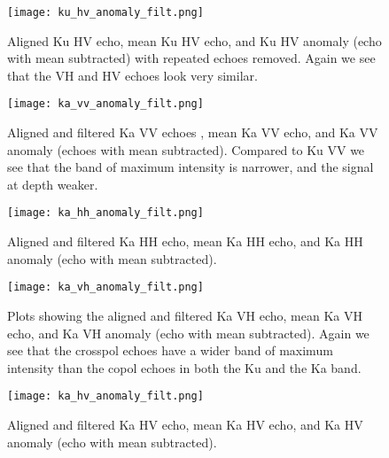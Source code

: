 \documentclass[11pt, a4paper]{article}
\begin{document}
\begin{figure}[H]
   		 \texttt{[image: ku\_hv\_anomaly\_filt.png]}
    		\caption{Aligned Ku HV echo, mean Ku HV echo,  and Ku HV anomaly (echo with mean subtracted) with repeated echoes removed. Again we see that the VH and HV echoes look very similar.}
	\label{fig:kuhvfilt}
\end{figure}

\begin{figure}[H]
   		 \texttt{[image: ka\_vv\_anomaly\_filt.png]}
    		\caption{Aligned and filtered Ka VV echoes , mean Ka VV echo,  and Ka VV anomaly (echoes with mean subtracted). Compared to Ku VV we see that the band of maximum intensity is narrower, and the signal at depth weaker.}
	\label{fig:kavvfilt}
\end{figure}

\begin{figure}[H]
   		 \texttt{[image: ka\_hh\_anomaly\_filt.png]}
    		\caption{Aligned and filtered Ka HH echo, mean Ka HH echo,  and Ka HH anomaly (echo with mean subtracted).}
	\label{fig:kahhfilt}
\end{figure}

\begin{figure}[H]
   		 \texttt{[image: ka\_vh\_anomaly\_filt.png]}
    		\caption{Plots showing the aligned and filtered Ka VH echo, mean Ka VH echo,  and Ka VH anomaly (echo with mean subtracted). Again we see that the crosspol echoes have a wider band of maximum intensity than the copol echoes in both the Ku and the Ka band.}
	\label{fig:kavhfilt}
\end{figure}

\begin{figure}[H]
   		 \texttt{[image: ka\_hv\_anomaly\_filt.png]}
    		\caption{Aligned and filtered Ka HV echo, mean Ka HV echo,  and Ka HV anomaly (echo with mean subtracted).}
	\label{fig:kahvfilt}
\end{figure}
\end{document}
